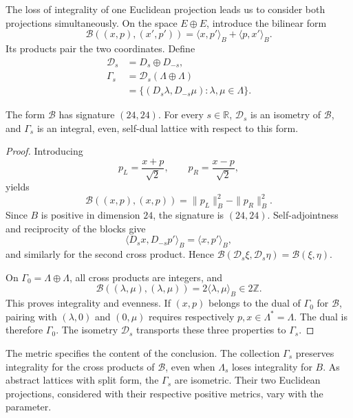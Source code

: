 The loss of integrality of one Euclidean projection leads us to
consider both projections simultaneously. On the space
\(E\oplus E\), introduce the bilinear form
\begin{equation}
 \mathcal B((x,p),(x',p'))=
       \langle x,p'\rangle_B+\langle p,x'\rangle_B.
 \label{eq:leech-split-form}
\end{equation}
Its products pair the two coordinates. Define
\begin{equation}
\begin{split}
 \mathcal D_s&=D_s\oplus D_{-s},\\
 \Gamma_s&=\mathcal D_s(\Lambda\oplus\Lambda)\\
 &=\{(D_s\lambda,D_{-s}\mu):\lambda,\mu\in\Lambda\}.
\end{split}
\label{eq:leech-split-lattice}
\end{equation}

\begin{theorem}
\label{thm:leech-split}
The form \(\mathcal B\) has signature \((24,24)\).
For every \(s\in\mathbb R\), \(\mathcal D_s\) is an isometry of
\(\mathcal B\), and \(\Gamma_s\) is an integral, even, self-dual lattice
with respect to this form.
\end{theorem}
\begin{proof}
Introducing
\[
 p_L=\frac{x+p}{\sqrt2},\qquad
 p_R=\frac{x-p}{\sqrt2},
\]
yields
\[
 \mathcal B((x,p),(x,p))=\|p_L\|_B^2-\|p_R\|_B^2.
\]
Since \(B\) is positive in dimension \(24\), the signature is
\((24,24)\). Self-adjointness and reciprocity of the blocks give
\[
 \langle D_sx,D_{-s}p'\rangle_B=\langle x,p'\rangle_B,
\]
and similarly for the second cross product. Hence
\(\mathcal B(\mathcal D_s\xi,\mathcal D_s\eta)=\mathcal B(\xi,\eta)\).

On \(\Gamma_0=\Lambda\oplus\Lambda\), all cross products
are integers, and
\[
 \mathcal B((\lambda,\mu),(\lambda,\mu))
   =2\langle\lambda,\mu\rangle_B\in2\mathbb Z.
\]
This proves integrality and evenness. If \((x,p)\) belongs to the dual
of \(\Gamma_0\) for \(\mathcal B\), pairing with
\((\lambda,0)\) and \((0,\mu)\) requires respectively
\(p,x\in\Lambda^*=\Lambda\). The dual is therefore \(\Gamma_0\).
The isometry \(\mathcal D_s\) transports these three properties
to \(\Gamma_s\).
\end{proof}

The metric specifies the content of the conclusion. The collection
\(\Gamma_s\) preserves integrality for the cross products
of \(\mathcal B\), even when \(\Lambda_s\) loses integrality
for \(B\). As abstract lattices with split form, the
\(\Gamma_s\) are isometric. Their two Euclidean projections,
considered with their respective positive metrics, vary with
the parameter.


